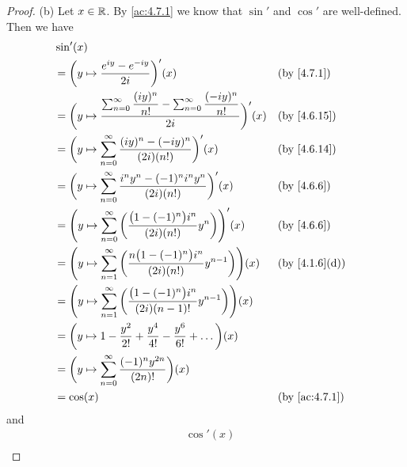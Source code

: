 \begin{proof}{(b)}
  Let \(x \in \mathbb{R}\).
  By \cref{ac:4.7.1} we know that \(\sin'\) and \(\cos'\) are well-defined.
  Then we have
  \begin{align*}
     & \sin'(x)                                                                                                                                                     \\
     & = \bigg(y \mapsto \dfrac{e^{i y} - e^{- i y}}{2i}\bigg)'(x)                                                                 &  & \by{4.7.1}                  \\
     & = \bigg(y \mapsto \dfrac{\sum_{n = 0}^\infty \dfrac{(i y)^n}{n!} - \sum_{n = 0}^\infty \dfrac{(- i y)^n}{n!}}{2i}\bigg)'(x) &  & \by{4.6.15}                 \\
     & = \bigg(y \mapsto \sum_{n = 0}^\infty \dfrac{(i y)^n - (- i y)^n}{(2i) (n!)}\bigg)'(x)                                      &  & \by{4.6.14}                 \\
     & = \bigg(y \mapsto \sum_{n = 0}^\infty \dfrac{i^n y^n - (-1)^n i^n y^n}{(2i) (n!)}\bigg)'(x)                                 &  & \by{4.6.6}                  \\
     & = \Bigg(y \mapsto \sum_{n = 0}^\infty \bigg(\dfrac{\big(1 - (-1)^n\big) i^n}{(2i) (n!)} y^n\bigg)\Bigg)'(x)                 &  & \by{4.6.6}                  \\
     & = \Bigg(y \mapsto \sum_{n = 1}^\infty \bigg(\dfrac{n \big(1 - (-1)^n\big) i^n}{(2i) (n!)} y^{n - 1}\bigg)\Bigg)(x)          &  & \text{(by \cref{4.1.6}(d))} \\
     & = \Bigg(y \mapsto \sum_{n = 1}^\infty \bigg(\dfrac{\big(1 - (-1)^n\big) i^n}{(2i) (n - 1)!} y^{n - 1}\bigg)\Bigg)(x)                                         \\
     & = \bigg(y \mapsto 1 - \dfrac{y^2}{2!} + \dfrac{y^4}{4!} - \dfrac{y^6}{6!} + \dots\bigg)(x)                                                                   \\
     & = \bigg(y \mapsto \sum_{n = 0}^\infty \dfrac{(-1)^n y^{2n}}{(2n)!}\bigg)(x)                                                                                  \\
     & = \cos(x)                                                                                                                   &  & \by{ac:4.7.1}
  \end{align*}
  and
  \begin{align*}
     & \cos'(x)                                                                                                                                                    \\

\end{align*}
\end{proof}
